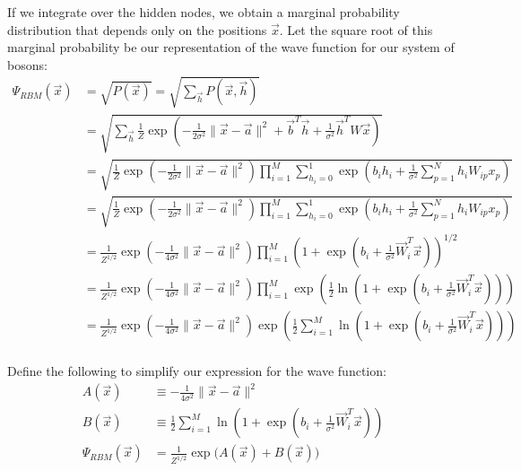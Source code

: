 \documentclass[12pt]{article}
\begin{document}
\noindent If we integrate over the hidden nodes, we obtain a marginal probability distribution that depends only on the positions $\vec{x}$. Let the square root of this marginal probability be our representation of the wave function for our system of bosons:
\begin{align*}
\Psi_{RBM}(\vec{x}) &= \sqrt{P(\vec{x})}= \sqrt{\sum_{\vec{h}} P(\vec{x},\vec{h})} \\
&= \sqrt{\sum_{\vec{h}}\frac{1}{Z} \exp \left( -\frac{1}{2\sigma^2} \| \vec{x}-\vec{a} \|^2 +\vec{b}^T \vec{h} + \frac{1}{\sigma^2} \vec{h}^T W \vec{x} \right) }\\
&= \sqrt{\frac{1}{Z} \exp \left( -\frac{1}{2\sigma^2} \| \vec{x}-\vec{a} \|^2 \right) \prod_{i=1}^M \sum_{h_i=0}^1 \exp \left(b_i h_i + \frac{1}{\sigma^2} \sum_{p=1}^N  h_i W_{ip} x_p\right) }\\
&= \sqrt{\frac{1}{Z} \exp \left( -\frac{1}{2\sigma^2} \| \vec{x}-\vec{a} \|^2 \right) \prod_{i=1}^M \sum_{h_i=0}^1 \exp \left(b_i h_i + \frac{1}{\sigma^2} \sum_{p=1}^N  h_i W_{ip} x_p\right) }\\
&=\frac{1}{Z^{1/2}} \exp \left( -\frac{1}{4\sigma^2} \| \vec{x}-\vec{a} \|^2 \right) \prod_{i=1}^M \left( 1 + \exp \left(b_i + \frac{1}{\sigma^2} \vec{W}_i^T \vec{x} \right) \right)^{1/2}\\
&=\frac{1}{Z^{1/2}} \exp \left( -\frac{1}{4\sigma^2} \| \vec{x}-\vec{a} \|^2 \right) \prod_{i=1}^M \exp \left( \frac{1}{2} \ln \left( 1 + \exp \left(b_i + \frac{1}{\sigma^2} \vec{W}_i^T \vec{x} \right) \right)\right)\\
&=\frac{1}{Z^{1/2}} \exp \left( -\frac{1}{4\sigma^2} \| \vec{x}-\vec{a} \|^2 \right) \exp \left( \frac{1}{2} \sum_{i=1}^M \ln \left( 1 + \exp \left(b_i + \frac{1}{\sigma^2} \vec{W}_i^T \vec{x} \right) \right)\right)\\
\end{align*}

\noindent Define the following to simplify our expression for the wave function:
\begin{align}
A(\vec{x}) &\equiv -\frac{1}{4\sigma^2} \| \vec{x}-\vec{a} \|^2\\
B(\vec{x}) &\equiv \frac{1}{2} \sum_{i=1}^M \ln \left( 1 + \exp \left(b_i + \frac{1}{\sigma^2} \vec{W}_i^T \vec{x} \right) \right)\\
\Psi_{RBM}(\vec{x}) &= \frac{1}{Z^{1/2}} \exp \big( A(\vec{x}) + B(\vec{x}) \big)
\end{align}
\end{document}
